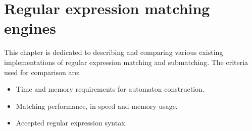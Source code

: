 \chapter{Regular expression matching engines}

This chapter is dedicated to describing and comparing various existing
implementations of regular expression matching and submatching. The criteria
used for comparison are:

\begin{itemize}
   \item Time and memory requirements for automaton construction.
   \item Matching performance, in speed and memory usage.
   \item Accepted regular expression syntax.
\end{itemize}





